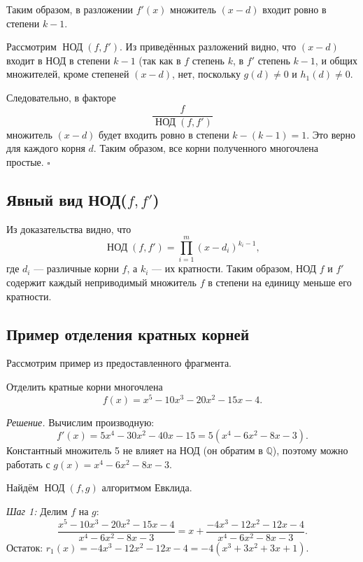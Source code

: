 \documentclass[a4paper,12pt]{article}
\theoremstyle{definition}
\theoremstyle{plain}
\theoremstyle{remark}
\begin{document}
	Таким образом, в разложении \( f'(x) \) множитель \( (x - d) \) входит ровно в степени \( k-1 \).
	
	Рассмотрим \( \operatorname{НОД}(f, f') \). Из приведённых разложений видно, что \( (x - d) \) входит в НОД в степени \( k-1 \) (так как в \( f \) степень \( k \), в \( f' \) степень \( k-1 \), и общих множителей, кроме степеней \( (x - d) \), нет, поскольку \( g(d) \neq 0 \) и \( h_1(d) \neq 0 \).
	
	Следовательно, в факторе
	\[
	\frac{f}{\operatorname{НОД}(f, f')}
	\]
	множитель \( (x - d) \) будет входить ровно в степени \( k - (k-1) = 1 \). Это верно для каждого корня \( d \). Таким образом, все корни полученного многочлена простые. \hfill \(\square\)
	
	\subsection{Явный вид НОД(\(f, f'\))}
	
	Из доказательства видно, что
	\[
	\operatorname{НОД}(f, f') = \prod_{i=1}^m (x - d_i)^{k_i - 1},
	\]
	где \( d_i \) — различные корни \( f \), а \( k_i \) — их кратности. Таким образом, НОД \( f \) и \( f' \) содержит каждый неприводимый множитель \( f \) в степени на единицу меньше его кратности.
	
	\subsection{Пример отделения кратных корней}
	
	Рассмотрим пример из предоставленного фрагмента.
	
	\begin{tcolorbox}[colback=red!5, colframe=red!50!black, title=Пример]
		Отделить кратные корни многочлена
		\[
		f(x) = x^5 - 10x^3 - 20x^2 - 15x - 4.
		\]
	\end{tcolorbox}
	
	\textit{Решение.}
	Вычислим производную:
	\[
	f'(x) = 5x^4 - 30x^2 - 40x - 15 = 5(x^4 - 6x^2 - 8x - 3).
	\]
	Константный множитель 5 не влияет на НОД (он обратим в \( \mathbb{Q} \)), поэтому можно работать с \( g(x) = x^4 - 6x^2 - 8x - 3 \).
	
	Найдём \( \operatorname{НОД}(f, g) \) алгоритмом Евклида.
	
	\textit{Шаг 1:} Делим \( f \) на \( g \):
	\[
	\frac{x^5 - 10x^3 - 20x^2 - 15x - 4}{x^4 - 6x^2 - 8x - 3} = x + \frac{-4x^3 - 12x^2 - 12x - 4}{x^4 - 6x^2 - 8x - 3}.
	\]
	Остаток: \( r_1(x) = -4x^3 - 12x^2 - 12x - 4 = -4(x^3 + 3x^2 + 3x + 1) \).
	
\end{document}

